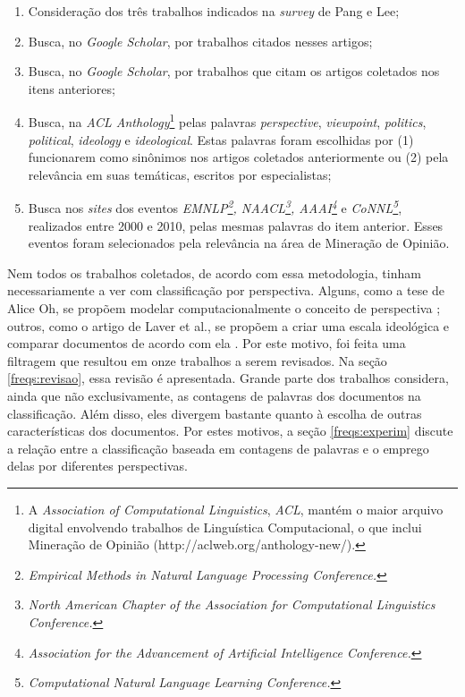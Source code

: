 \begin{enumerate}
\item Consideração dos três trabalhos indicados na \emph{survey} de Pang e Lee;
\item Busca, no \emph{Google Scholar}, por trabalhos citados nesses artigos;
\item Busca, no \emph{Google Scholar}, por trabalhos que citam os artigos coletados nos itens anteriores;
\item Busca, na \emph{ACL Anthology}\footnote{A \emph{Association of Computational Linguistics}, \emph{ACL}, mantém o maior arquivo digital envolvendo trabalhos de Linguística Computacional, o que inclui Mineração de Opinião (http://aclweb.org/anthology-new/).} pelas palavras \emph{perspective}, \emph{viewpoint}, \emph{politics}, \emph{political}, \emph{ideology} e \emph{ideological}. Estas palavras foram escolhidas por (1) funcionarem como sinônimos nos artigos coletados anteriormente ou (2) pela relevância em suas temáticas, escritos por especialistas;
\item Busca nos \emph{sites} dos eventos \emph{EMNLP\footnote{\emph{Empirical Methods in Natural Language Processing Conference.}}, NAACL\footnote{\emph{North American Chapter of the Association for Computational Linguistics Conference.}}, AAAI\footnote{\emph{Association for the Advancement of Artificial Intelligence Conference.}}} e \emph{CoNNL\footnote{\emph{Computational Natural Language Learning Conference.}}}, realizados entre 2000 e 2010, pelas mesmas palavras do item anterior. Esses eventos foram selecionados pela relevância na área de Mineração de Opinião. 
\end{enumerate}

Nem todos os trabalhos coletados, de acordo com essa metodologia, tinham necessariamente a ver com classificação por perspectiva. Alguns, como a tese de Alice Oh, se propõem modelar computacionalmente o conceito de perspectiva \cite{alice-oh}; outros, como o artigo de Laver et al., se propõem a criar uma escala ideológica e comparar documentos de acordo com ela \cite{wordscores}.  Por este motivo, foi feita uma filtragem que resultou em onze trabalhos a serem revisados. Na seção \ref{freqs:revisao}, essa revisão é apresentada. Grande parte dos trabalhos considera, ainda que não exclusivamente, as contagens de palavras dos documentos na classificação. Além disso, eles divergem bastante quanto à escolha de outras características dos documentos. Por estes motivos, a seção \ref{freqs:experim} discute a relação entre a classificação baseada em contagens de palavras e o emprego delas por diferentes perspectivas. %

